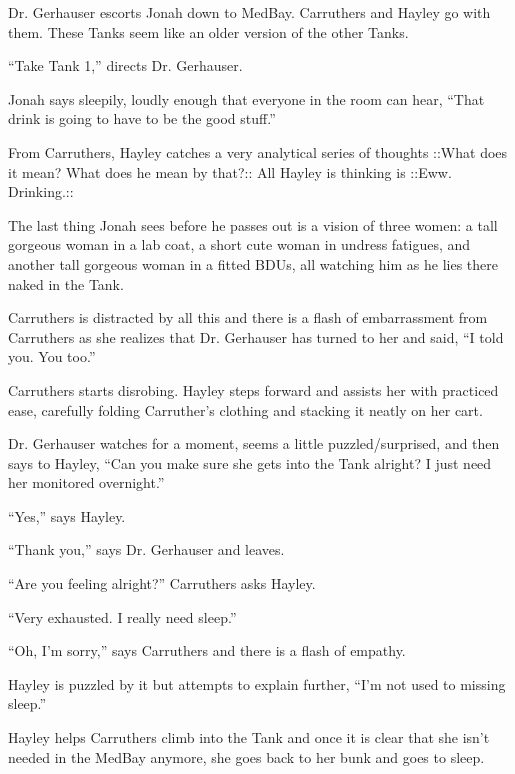 Dr. Gerhauser escorts Jonah down to MedBay.  Carruthers and Hayley go with them.  These Tanks seem like an older version of the other Tanks.  



``Take Tank 1,'' directs Dr. Gerhauser.

Jonah says sleepily, loudly enough that everyone in the room can hear, ``That drink is going to have to be the good stuff.''

From Carruthers, Hayley catches a very analytical series of thoughts  {\color[RGB]{153,0,255}::What does it mean? What does he mean by that?::}    All Hayley is thinking is  {\color[RGB]{255,153,0}::Eww.  Drinking.::} 



The last thing Jonah sees before he passes out is a vision of three women: a tall gorgeous woman in a lab coat, a short cute woman in undress fatigues, and another tall gorgeous woman in a fitted BDUs, all watching him as he lies there naked in the Tank.



Carruthers is distracted by all this and there is a flash of embarrassment from Carruthers as she realizes that Dr. Gerhauser has turned to her and said, ``I told you.  You too.''

Carruthers starts disrobing.  Hayley steps forward and assists her with practiced ease, carefully folding Carruther's clothing and stacking it neatly on her cart.

Dr. Gerhauser watches for a moment, seems a little puzzled/surprised, and then says to Hayley, ``Can you make sure she gets into the Tank alright?  I just need her monitored overnight.''

``Yes,'' says Hayley.

``Thank you,'' says Dr. Gerhauser and leaves.

``Are you feeling alright?'' Carruthers asks Hayley.

``Very exhausted.  I really need sleep.''

``Oh, I'm sorry,'' says Carruthers and there is a flash of empathy.  

Hayley is puzzled by it but attempts to explain further, ``I'm not used to missing sleep.''

Hayley helps Carruthers climb into the Tank and once it is clear that she isn't needed in the MedBay anymore, she goes back to her bunk and goes to sleep.





